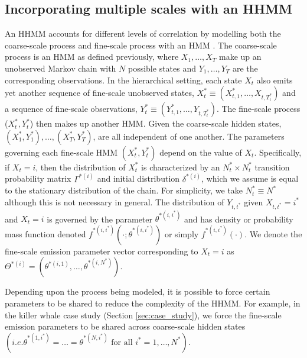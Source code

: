 \subsection{Incorporating multiple scales with an HHMM}

An HHMM accounts for different levels of correlation by modelling both the coarse-scale process and fine-scale process with an HMM \citep{Barajas:2017,Adam:2019}. The coarse-scale process is an HMM as defined previously, where $X_1, \ldots, X_T$ make up an unobserved Markov chain with $N$ possible states and $Y_1,\ldots, Y_T$ are the corresponding observations.   
%
In the hierarchical setting, each state $X_t$ also emits yet another sequence of fine-scale unobserved states, $X_t^* \equiv (X_{t,1}^*,\ldots, X_{t,T_t^*})$ and a sequence of fine-scale observations, $Y_t^* \equiv (Y_{t,1}^*,\ldots, Y_{t,T_t^*})$. The fine-scale process ($X_t^*, Y_t^*$) then makes up another HMM. Given the coarse-scale hidden states, $(X_1^*, Y_1^*), \ldots, (X_T^*, Y_T^*)$, are all independent of one another. The parameters governing each fine-scale HMM $(X_t^*,Y_t^*)$ depend on the value of $X_t$. Specifically, if $X_t=i$, then the distribution of $X_t^*$ is characterized by an $N^*_t \times N^*_t$ transition probability matrix $\Gamma^{*(i)}$ and initial distribution $\delta^{*(i)}$, which we assume is equal to the stationary distribution of the chain. For simplicity, we take $N_t^* \equiv N^*$ although this is not necessary in general. The distribution of $Y_{t, t^*}$ given $X_{t, t^*}=i^*$ and $X_t=i$ is governed by the parameter $\theta^{*(i,i^*)}$ and has density or probability mass function denoted $f^{*(i,i^*)}\left(\cdot; \theta^{*(i,i^*)}\right)$ or simply $f^{*(i,i^*)}(\cdot)$. We denote the fine-scale emission parameter vector corresponding to $X_t=i$ as $\Theta^{*(i)}=\left(\theta^{*(i,1)}, \ldots, \theta^{*(i,N^*)}\right)$.

Depending upon the process being modeled, it is possible to force certain parameters to be shared to reduce the complexity of the HHMM. For example, in the killer whale case study (Section \ref{sec:case_study}), we force the fine-scale emission parameters to be shared across coarse-scale hidden states $\left( i.e.  \theta^{*(1,i^*)} = \ldots = \theta^{*(N,i^*)} \text{ for all } i^* = 1, \ldots, N^* \right)$. 

